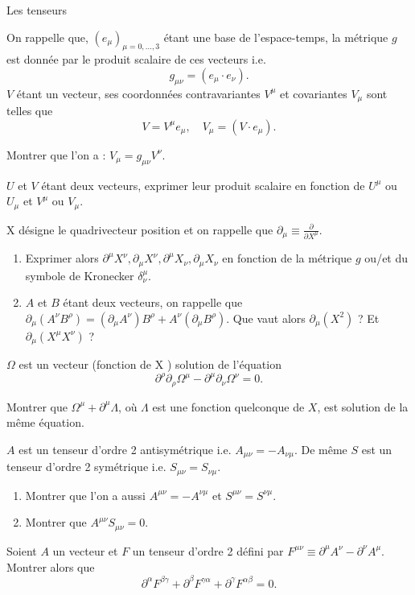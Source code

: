 \begin{exo}[PC][1][colle]{Les tenseurs}
    
    On rappelle que, $\left(e_\mu\right)_{\mu=0, \ldots, 3}$ étant une base de l'espace-temps, la métrique $g$ est donnée par le produit scalaire de ces vecteurs i.e.
    $$
    g_{\mu \nu}=\left(e_\mu \cdot e_\nu\right) .
    $$
$V$ étant un vecteur, ses coordonnées contravariantes $V^\mu$ et covariantes $V_\mu$ sont telles que
$$
V=V^\mu e_\mu, \quad V_\mu=\left(V \cdot e_\mu\right) .
$$
\begin{quest}
    \item Montrer que l'on a : $V_\mu=g_{\mu \nu} V^\nu$.
    \item $U$ et $V$ étant deux vecteurs, exprimer leur produit scalaire en fonction de $U^\mu$ ou $U_\mu$ et $V^\mu$ ou $V_\mu$.
\item X désigne le quadrivecteur position et on rappelle que $\partial_\mu \equiv \frac{\partial}{\partial X^\mu}$.
\begin{enumerate}
    \item Exprimer alors $\partial^\mu X^\nu, \partial_\mu X^\nu, \partial^\mu X_\nu, \partial_\mu X_\nu$ en fonction de la métrique $g$ ou/et du symbole de Kronecker $\delta_\nu^\mu$.
    \item $A$ et $B$ étant deux vecteurs, on rappelle que $\partial_\mu\left(A^\nu B^\rho\right)=\left(\partial_\mu A^\nu\right) B^\rho+A^\nu\left(\partial_\mu B^\rho\right)$. Que vaut alors $\partial_\mu\left(X^2\right)$ ? Et $\partial_\mu\left(X^\mu X^\nu\right)$ ?
\end{enumerate}
    \item $\Omega$ est un vecteur (fonction de X ) solution de l'équation
    $$
    \partial^\rho \partial_\rho \Omega^\mu-\partial^\mu \partial_\nu \Omega^\nu=0 .
    $$
    
    Montrer que $\Omega^\mu+\partial^\mu \Lambda$, où $\Lambda$ est une fonction quelconque de $X$, est solution de la même équation.
\item $A$ est un tenseur d'ordre 2 antisymétrique i.e. $A_{\mu \nu}=-A_{\nu \mu}$. De même $S$ est un tenseur d'ordre 2 symétrique i.e. $S_{\mu \nu}=S_{\nu \mu}$.
\begin{enumerate}
    \item Montrer que l'on a aussi $A^{\mu \nu}=-A^{\nu \mu}$ et $S^{\mu \nu}=S^{\nu \mu}$.
    \item Montrer que $A^{\mu \nu} S_{\mu \nu}=0$.
\end{enumerate}
\item Soient $A$ un vecteur et $F$ un tenseur d'ordre 2 défini par $F^{\mu \nu} \equiv \partial^\mu A^\nu-\partial^\nu A^\mu$. Montrer alors que
$$
\partial^\alpha F^{\beta \gamma}+\partial^\beta F^{\gamma \alpha}+\partial^\gamma F^{\alpha \beta}=0 .
$$
\end{quest}
\end{exo}
